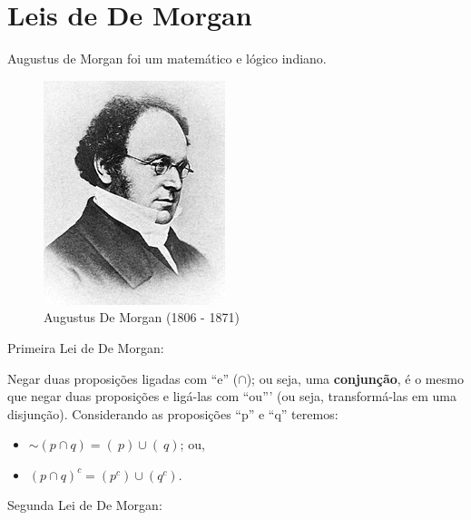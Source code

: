 \documentclass[
]{book}
\providecommand{\tightlist}{%
  \setlength{\itemsep}{0pt}\setlength{\parskip}{0pt}}
\begin{document}
\hypertarget{leis-de-de-morgan}{%
\section{Leis de De Morgan}\label{leis-de-de-morgan}}

Augustus de Morgan foi um matemático e lógico indiano.

\hfill\break

\begin{figure}

{\centering \includegraphics[width=0.5\linewidth]{images4/de_morgan} 

}

\caption{Augustus De Morgan (1806 - 1871)}\label{fig:unnamed-chunk-9}
\end{figure}

\hfill\break

Primeira Lei de De Morgan:

\hfill\break

Negar duas proposições ligadas com ``e'' (\(\cap\)); ou seja, uma \textbf{conjunção}, é o mesmo que negar duas proposições e ligá-las com ``ou''' (ou seja, transformá-las em uma disjunção). Considerando as proposições ``p'' e ``q'' teremos:

\hfill\break

\begin{itemize}
\tightlist
\item
  \(\sim (p \cap q) = (~p) \cup (~q)\); ou,\\
\item
  \((p \cap q)^{c} = (p^{c}) \cup (q^{c})\).
\end{itemize}

\hfill\break

Segunda Lei de De Morgan:
\end{document}
